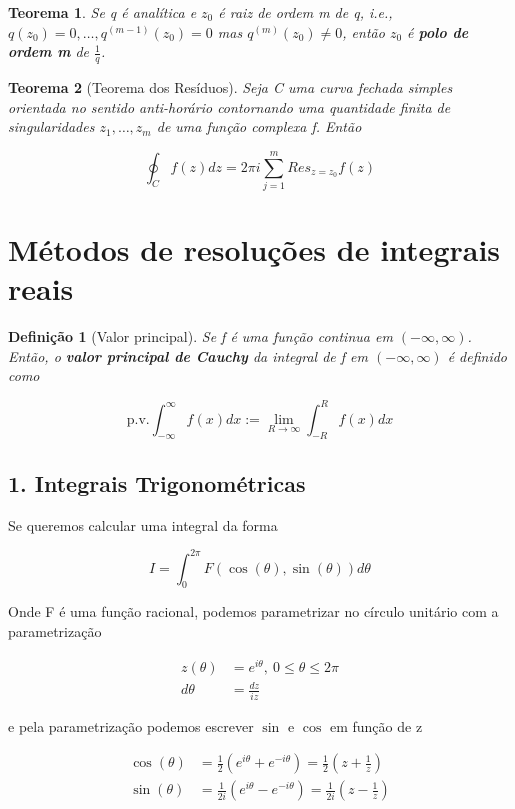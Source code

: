 \documentclass{article}
\newtheorem{theorem}{Teorema}
\newtheorem{definition}{Definição}
\begin{document}
\begin{theorem}
Se q é analítica e $z_0$ é raiz de ordem m de q, i.e., $q(z_0) = 0, \ldots, q^{(m - 1)}(z_0) = 0$ mas $q^{(m)}(z_0) \neq 0$, então $z_0$ é \textbf{polo de ordem m} de $\frac{1}{q}$.
\end{theorem}

\begin{theorem}[Teorema dos Resíduos]
Seja C uma curva fechada simples orientada no sentido anti-horário contornando uma quantidade finita de singularidades $z_1, \ldots, z_m$ de uma função complexa f. Então

$$\oint_C f(z) d z = 2 \pi i \sum_{j = 1}^m Res_{z = z_0} f(z)$$
\end{theorem}

\section*{Métodos de resoluções de integrais reais}
\label{s10}
\begin{definition}[Valor principal]
Se f é uma função continua em $(- \infty, \infty)$. Então, o \textbf{valor principal de Cauchy} da integral de f em $(- \infty, \infty)$ é definido como

$$\mathrm{p.v.} \int_{-\infty}^\infty f(x) d x := \lim_{R \to \infty} \int_{-R}^R f(x) d x$$
\end{definition}

\subsection*{1. Integrais Trigonométricas}
Se queremos calcular uma integral da forma

$$I = \int_0^{2\pi} F(\cos(\theta), \sin(\theta)) d \theta $$

Onde F é uma função racional, podemos parametrizar no círculo unitário com a parametrização

\begin{align*}
    z(\theta) &= e^{i \theta},\ 0 \leq \theta \leq 2 \pi \\
    d \theta &= \frac{d z}{i z}
\end{align*}

e pela parametrização podemos escrever $\sin$ e $\cos$ em função de z  

\begin{align*}
    \cos(\theta) &= \frac{1}{2} (e^{i \theta} + e^{ - i \theta}) = \frac{1}{2} \left(z + \frac{1}{z} \right) \\
    \sin(\theta) &= \frac{1}{2i} (e^{i \theta} - e^{ - i \theta}) = \frac{1}{2 i} \left(z - \frac{1}{z} \right)
\end{align*}
\end{document}
